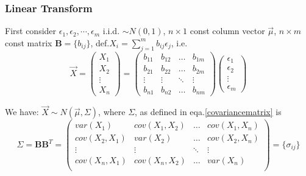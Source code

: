 \documentclass[11pt,a4paper]{ctexart}
\numberwithin{equation}{section}%
\begin{document}
\subsubsection{Linear Transform}
    First consider $\epsilon_1,\epsilon_2,\cdots,\epsilon_m$ i.i.d. $\sim N(0,1)$, $n\times 1$ const column vector $\vec{\mu}$, $n\times m$ const matrix $\mathbf{B}=\{b_{ij}\}$, def.$X_i={\displaystyle\sum_{j=1}^m b_{ij}\epsilon_j}$, i.e.
    \[
        \vec{X}=
        \begin{pmatrix}
            X_1\\X_2\\ \vdots\\X_n
        \end{pmatrix}
        =
        \begin{pmatrix}
            b_{11}&b_{12}&\ldots&b_{1m}\\
            b_{21}&b_{22}&\ldots&b_{2m}\\
            \vdots&\vdots&\ddots&\vdots\\
            b_{n1}&b_{n2}&\ldots&b_{nm}
        \end{pmatrix}
        \begin{pmatrix}
            \epsilon_1\\
            \epsilon_2\\
            \vdots\\
            \epsilon_m
        \end{pmatrix}
    \]

    
    We have: $\vec{X}\sim N(\vec{\mu},\Sigma)$, where $\Sigma$, as defined in eqa.\ref{covariancematrix} is
    \[
        \Sigma=\mathbf{BB}^T=
        \begin{pmatrix}
        var(X_1) & cov(X_1,X_2) & \ldots & cov(X_1,X_n)\\
        cov(X_2,X_1) & var(X_2) & \ldots & cov(X_2,X_n)\\
        \vdots & \vdots & \ddots & \vdots\\
        cov(X_n,X_1) & cov(X_n,X_2) & \ldots & var(X_n)\\
        \end{pmatrix}  
        =\{\sigma_{ij}\}  
    \]
\end{document}
